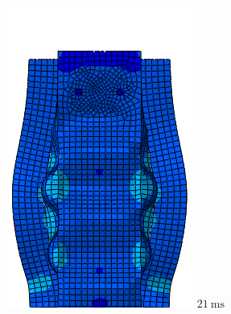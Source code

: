 \documentclass[
documentsize = a4, %
font = cmr, %
typesize = 11, %
printmode = true,
onehalfspacing = true,
language = en, %
titlepage = udciccp, %
degree = pt, %
dedication = true,
acknowledgements = true,
abstract-en = true,
abstract-es = false,
abstract-ga = false,
epigraphs = true,
toc = true,
lof = true,
lot = true,
frontmatterintoc = false,
notation = false,
minimal = false,
]{UDCthesis}
\begin{document}
\begin{figure}
\begin{minipage}[b]{.15\linewidth}
		\includegraphics[width=\linewidth]{IMG_CUTRES/c7}
		$\SI{21}{\ms}$
	\end{minipage}
	\quad
	\begin{minipage}[b]{.15\linewidth}
		\centering

\end{minipage}
\end{figure}
\end{document}
